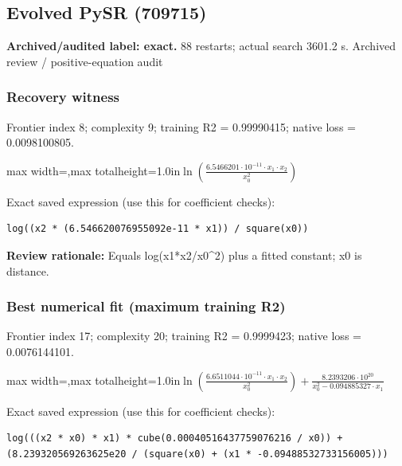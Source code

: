\documentclass[10pt,letterpaper,landscape]{article}
\begin{document}
\begin{minipage}[t]{0.485\textwidth}
\subsection*{Evolved PySR (709715)}
\textbf{Archived/audited label: exact.} 88 restarts; actual search 3601.2 s.
{\small Archived review / positive-equation audit}
\subsubsection*{Recovery witness}
Frontier index 8; complexity 9; training R2 = 0.99990415; native loss = 0.0098100805.
\begin{center}\begin{adjustbox}{max width=\linewidth,max totalheight=1.0in}$\displaystyle \ln{\left(\frac{6.5466201 \cdot 10^{-11} \cdot x_{1} \cdot x_{2}}{x_{0}^{2}} \right)}$\end{adjustbox}\end{center}
{\scriptsize Exact saved expression (use this for coefficient checks):}
\begin{lstlisting}
log((x2 * (6.546620076955092e-11 * x1)) / square(x0))
\end{lstlisting}
{\small\textbf{Review rationale:} Equals log(x1*x2/x0\textasciicircum{}2) plus a fitted constant; x0 is distance.}
\subsubsection*{Best numerical fit (maximum training R2)}
Frontier index 17; complexity 20; training R2 = 0.9999423; native loss = 0.0076144101.
\begin{center}\begin{adjustbox}{max width=\linewidth,max totalheight=1.0in}$\displaystyle \ln{\left(\frac{6.6511044 \cdot 10^{-11} \cdot x_{1} \cdot x_{2}}{x_{0}^{2}} \right)} + \frac{8.2393206 \cdot 10^{20}}{x_{0}^{2} - 0.094885327 \cdot x_{1}}$\end{adjustbox}\end{center}
{\scriptsize Exact saved expression (use this for coefficient checks):}
\begin{lstlisting}
log(((x2 * x0) * x1) * cube(0.00040516437759076216 / x0)) + (8.239320569263625e20 / (square(x0) + (x1 * -0.09488532733156005)))
\end{lstlisting}
\end{minipage}
\clearpage{}\label{newton-10009}
\end{document}
